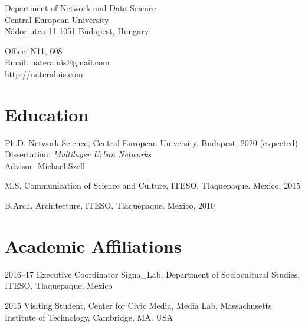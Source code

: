 \documentclass{academiccv}
\begin{document}
\raggedright

\namefont{\myname}

\vspace{1em}
\begin{minipage}[t]{0.495\textwidth}
  Department of Network and Data Science \\
  Central European University \\
  Nádor utca 11
  1051 Budapest, Hungary
\end{minipage}
\begin{minipage}[t]{0.495\textwidth}
  Office: N11, 608 \\
  Email: nateraluis@gmail.com \\
  http://nateraluis.com \\
\end{minipage}
\vspace{0.5em}



\section*{Education}

\begin{tablist}
	
\item[Ph.D. ] \tab Network Science, Central European University, Budapest, 2020 (expected) \\
                  Dissertation: \textit{Multilayer Urban Networks} \\
                  Advisor: Michael Szell
                  
\item[M.S.]  \tab Communication of Science and Culture, ITESO, Tlaquepaque. Mexico, 2015

\item[B.Arch.]  \tab Architecture,  ITESO, Tlaquepaque. Mexico, 2010

\end{tablist}



\section*{Academic Affiliations}

\begin{tablist}                     

\item[2016--17] \tab Executive Coordinator Signa\_Lab, Department of Sociocultural Studies, ITESO, Tlaquepaque. Mexico

\item[2015] \tab Visiting Student, Center for Civic Media,  Media Lab, Massachusetts Institute of Technology, Cambridge, MA. USA

\end{tablist}
\end{document}
